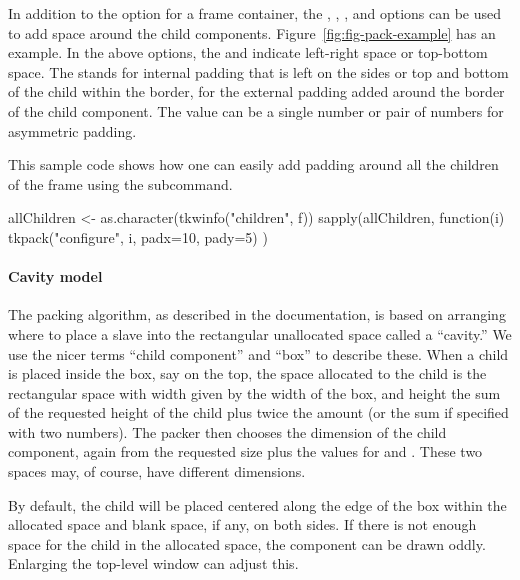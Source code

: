 In addition to the  option for a frame container, the
, , ,
and  options can be used to add space around the
child components. Figure~\ref{fig:fig-pack-example} has an
example. In the above options, the  and  indicate left-right space or
top-bottom space. The  stands for internal padding that is
left on the sides or top and bottom of the child within the border,
for  the external padding added around the border of the
child component. The value can be a single number or pair of numbers
for asymmetric padding.


This sample code shows how one can easily add padding around all the
children of the frame  using the
 subcommand.

\begin{Schunk}
\begin{Sinput}
 allChildren <- as.character(tkwinfo("children", f))
 sapply(allChildren, function(i) {
   tkpack("configure", i,  padx=10, pady=5)
 })
\end{Sinput}
\end{Schunk}


\paragraph{Cavity model}
The packing algorithm, as described in the \Tk\/ documentation, is based
on arranging where to place a slave into the rectangular unallocated
space called a ``cavity.'' We use the nicer terms ``child component'' and ``box''
to describe these. When a child is placed inside the box, say on the
top, the space allocated to the child is the rectangular space with
width given by the width of the box, and height the sum of the
requested height of the child plus twice the  amount (or
the sum if specified with two numbers). The packer then chooses the
dimension of the child component, again from the requested size plus
the  values for  and . These two spaces
may, of course, have different dimensions.



By default, the child  will be placed centered along the edge of
the box within the allocated space and blank space, if any, on both
sides.  If there is not enough space for the child in the allocated
space, the component can be drawn oddly. Enlarging the top-level
window can adjust this. 



